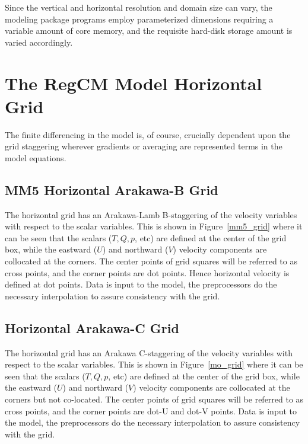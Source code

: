 Since the vertical and horizontal resolution and domain size can vary, the
modeling package programs employ parameterized dimensions requiring a variable
amount of core memory, and the requisite hard-disk storage amount is varied
accordingly.

\section{The \ac{RegCM} Model Horizontal Grid}

The finite differencing in the model is, of course, crucially dependent upon the
grid staggering wherever gradients or averaging are represented terms in the
model equations.

\subsection{\ac{MM5} Horizontal Arakawa-B Grid}

The horizontal grid has an Arakawa-Lamb B-staggering of the velocity variables
with respect to the scalar variables. This is shown in Figure~\ref{mm5_grid}
where it can be seen that the scalars ($T,Q,p$, etc) are defined at the center
of the grid box, while the eastward ($U$) and northward ($V$) velocity
components are collocated at the corners.
The center points of grid squares will be referred to as cross points, and the
corner points are dot points.  Hence horizontal velocity is defined at dot
points. Data is input to the model, the preprocessors
do the necessary interpolation to assure consistency with the grid.

\subsection{Horizontal Arakawa-C Grid}

The horizontal grid has an Arakawa C-staggering of the velocity variables
with respect to the scalar variables. This is shown in Figure~\ref{mo_grid}
where it can be seen that the scalars ($T,Q,p$, etc) are defined at the center
of the grid box, while the eastward ($U$) and northward ($V$) velocity
components are collocated at the corners but not co-located.
The center points of grid squares will be referred to as cross points, and the
corner points are dot-U and dot-V points.
Data is input to the model, the preprocessors
do the necessary interpolation to assure consistency with the grid.

